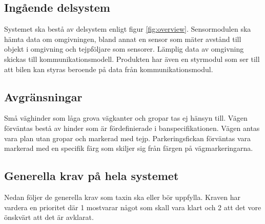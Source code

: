\documentclass[kravspec/krav.tex]{subfiles}
\begin{document}
\subsection{Ingående delsystem}
Systemet ska bestå av delsystem enligt figur \ref{fig:overview}. Sensormodulen
ska hämta data om omgivningen, bland annat en sensor som mäter avstånd till
objekt i omgivning och tejpföljare som sensorer. Lämplig data av omgivning
skickas till kommunikationsmodell. Produkten har även en styrmodul som ser till
att bilen kan styras beroende på data från kommunikationsmodul.

\subsection{Avgränsningar}
Små väghinder som låga grova vägkanter och gropar tas ej hänsyn till. Vägen
förväntas bestå av hinder som är fördefinierade i banspecifikationen. Vägen
antas vara plan utan gropar och markerad med tejp. Parkeringsfickan förväntas
vara markerad med en specifik färg som skiljer sig från färgen på
vägmarkeringarna.

\subsection{Generella krav på hela systemet}
Nedan följer de generella krav som taxin ska eller bör uppfylla.  Kraven har
vardera en prioritet där 1 mostvarar något som skall vara klart och 2 att det
vore önskvärt att det är avklarat.
\end{document}
